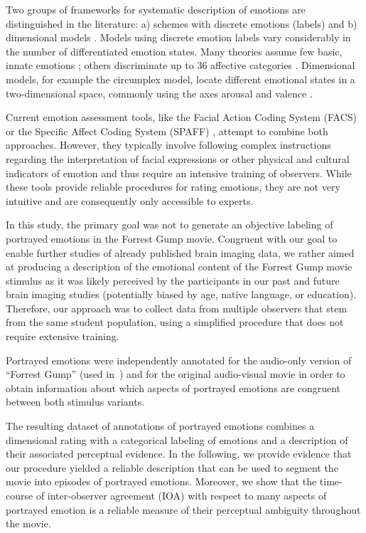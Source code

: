 \documentclass[10pt,a4paper,twocolumn]{article}
\begin{document}
Two groups of frameworks for systematic description of emotions are
distinguished in the literature: a) schemes with discrete emotions (labels) and
b) dimensional models \cite{GW2007}. Models using discrete emotion labels vary
considerably in the number of differentiated emotion states. Many theories
assume few basic, innate emotions \cite{Ekm1992a}; others discriminate up to 36
affective categories \cite{Sch2005}. Dimensional models, for example the
circumplex model, locate different emotional states in a two-dimensional space,
commonly using the axes arousal and valence \cite{Rus1980}.

Current emotion assessment tools, like the Facial Action Coding System (FACS)
or the Specific Affect Coding System (SPAFF) \cite{CG2007}, attempt to combine
both approaches. However, they typically involve following complex instructions
regarding the interpretation of facial expressions or other physical and
cultural indicators of emotion \cite[p. 281]{CG2007} and thus require an
intensive training of observers. While these tools provide reliable procedures
for rating emotions, they are not very intuitive and are consequently only
accessible to experts.

In this study, the primary goal was not to generate an objective labeling of
portrayed emotions in the Forrest Gump movie. Congruent with our goal to
enable further studies of already published brain imaging data, we rather aimed
at producing a description of the emotional content of the Forrest Gump movie
stimulus as it was likely perceived by the participants in our past and future
brain imaging studies (potentially biased by age, native language, or
education). Therefore, our approach was to collect data from multiple observers
that stem from the same student population, using a simplified procedure that
does not require extensive training.

Portrayed emotions were independently annotated for the audio-only version of
``Forrest Gump'' (used in~\cite{HBI+14}) and for the original audio-visual
movie in order to obtain information about which aspects of portrayed emotions
are congruent between both stimulus variants.

The resulting dataset of annotations of portrayed emotions combines a
dimensional rating with a categorical labeling of emotions and a description of
their associated perceptual evidence. In the following, we provide evidence
that our procedure yielded a reliable description that can be used to segment
the movie into episodes of portrayed emotions. Moreover, we show that the
time-course of inter-observer agreement (IOA) with respect to many aspects of
portrayed emotion is a reliable measure of their perceptual ambiguity
throughout the movie.
\end{document}
